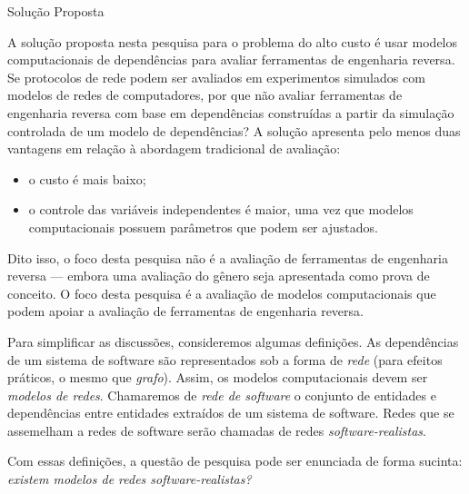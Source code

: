 \begin{section}{Solução Proposta}
	
	
	A solução proposta nesta pesquisa para o problema do alto custo é usar modelos computacionais de dependências para avaliar ferramentas de engenharia reversa. Se protocolos de rede podem ser avaliados em experimentos simulados com modelos de redes de computadores, por que não avaliar ferramentas de engenharia reversa com base em dependências construídas a partir da simulação controlada de um modelo de dependências? A solução apresenta pelo menos duas vantagens em relação à abordagem tradicional de avaliação: 
	
	\begin{itemize}
		\item o custo é mais baixo;
		\item o controle das variáveis independentes é maior, uma vez que modelos computacionais possuem parâmetros que podem ser ajustados.
	\end{itemize}

	Dito isso, o foco desta pesquisa não é a avaliação de ferramentas de engenharia reversa --- embora uma avaliação do gênero seja apresentada como prova de conceito. O foco desta pesquisa é a avaliação de modelos computacionais que podem apoiar a avaliação de ferramentas de engenharia reversa. 
	
	Para simplificar as discussões, consideremos algumas definições. As dependências de um sistema de software são representados sob a forma de \emph{rede} (para efeitos práticos, o mesmo que \emph{grafo}). Assim, os modelos computacionais devem ser \emph{modelos de redes}. Chamaremos de \emph{rede de software} o conjunto de entidades e dependências entre entidades extraídos de um sistema de software. Redes que se assemelham a redes de software serão chamadas de redes \emph{software-realistas}.
	
	Com essas definições, a questão de pesquisa pode ser enunciada de forma sucinta: \emph{existem modelos de redes software-realistas?}
	
	
\end{section}

